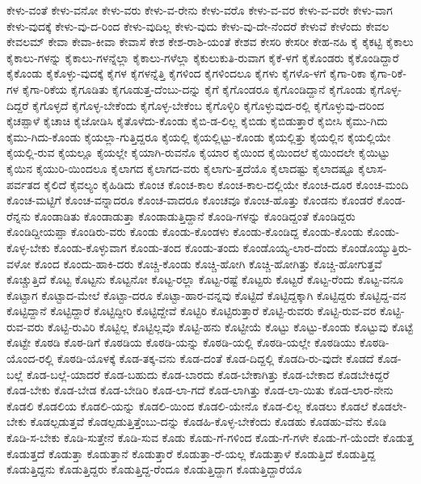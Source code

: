 {ಕೇಳು-ವಂತೆ
ಕೇಳು-ವನೋ
ಕೇಳು-ವರು
ಕೇಳು-ವ-ರೇನು
ಕೇಳು-ವರೊ
ಕೇಳು-ವ-ವರ
ಕೇಳು-ವ-ವರೇ
ಕೇಳು-ವಾಗ
ಕೇಳು-ವುದಕ್ಕೆ
ಕೇಳು-ವು-ದ-ರಿಂದ
ಕೇಳು-ವುದಿಲ್ಲ
ಕೇಳು-ವುದು
ಕೇಳು-ವು-ದೇ-ನೆಂದರೆ
ಕೇಳುವೆ
ಕೇಳೆಂದು
ಕೇವಲ
ಕೇವಲಮ್
ಕೇವಾ
ಕೇವಾ-ಕೀವಾ
ಕೇವಾಸೆ
ಕೇಶ
ಕೇಶ-ರಾಶಿ-ಯಂತೆ
ಕೇಶವ
ಕೇಸರಿ
ಕೇಸರೀ
ಕೇಹ-ನಹಿ
ಕೈ
ಕೈಕಟ್ಟಿ
ಕೈಕಾಲು
ಕೈಕಾಲು-ಗಳನ್ನು
ಕೈಕಾಲು-ಗಳನ್ನೆಲ್ಲಾ
ಕೈಕಾಲು-ಗಳೆಲ್ಲಾ
ಕೈಕುಲುಕುತಿ-ರುವಾಗ
ಕೈಕೆ-ಳಗೆ
ಕೈಕೊಂಡರು
ಕೈಕೊಂಡಿದ್ದಾರೆ
ಕೈಕೊಂಡು
ಕೈಕೊಳ್ಳು-ವುದಕ್ಕೆ
ಕೈಗಳ
ಕೈಗಳನ್ನೆತ್ತಿ
ಕೈಗಳಿಂದ
ಕೈಗಳಿಂದಲೂ
ಕೈಗಳು
ಕೈಗಳೊ-ಳಗೆ
ಕೈಗಾ-ರಿಕಾ
ಕೈಗಾ-ರಿಕೆ-ಗಳ
ಕೈಗಾ-ರಿಕೆಯ
ಕೈಗೂಡಿತು
ಕೈಗೂಡುತ್ತ-ದೆಂಬು-ದನ್ನು
ಕೈಗೆ
ಕೈಗೊಂಡರೂ
ಕೈಗೊಂಡಿದ್ದಾನೆ
ಕೈಗೊಂಡು
ಕೈಗೊಳ್ಳ-ದಿದ್ದರೆ
ಕೈಗೊಳ್ಳದೆ
ಕೈಗೊಳ್ಳ-ಬೇಕೆಂದು
ಕೈಗೊಳ್ಳ-ಬೇಕೆಂಬ
ಕೈಗೊಳ್ಳಿರಿ
ಕೈಗೊಳ್ಳುವುದ-ರಲ್ಲಿ
ಕೈಗೊಳ್ಳುವು-ದರಿಂದ
ಕೈಚಪ್ಪಾಳೆ
ಕೈಚಾಚಿ
ಕೈಜೋಡಿಸಿ
ಕೈತೊಳೆದು-ಕೊಂಡು
ಕೈಬಿ-ಡ-ಲಿಲ್ಲ
ಕೈಬಿಡು
ಕೈಬಿಡುತ್ತಾರೆ
ಕೈಬೀಸಿ
ಕೈಮು-ಗಿದು
ಕೈಮು-ಗಿದು-ಕೊಂಡು
ಕೈಯಲ್ಲಾ-ಗುತ್ತಿದ್ದರೂ
ಕೈಯಲ್ಲಿ
ಕೈಯಲ್ಲಿಟ್ಟು-ಕೊಂಡು
ಕೈಯಲ್ಲಿತ್ತು
ಕೈಯಲ್ಲಿನ
ಕೈಯಲ್ಲಿಯೇ
ಕೈಯಲ್ಲಿ-ರುವ
ಕೈಯಲ್ಲೂ
ಕೈಯಲ್ಲೇ
ಕೈಯಾಗಿ-ರುವನೊ
ಕೈಯಾರ
ಕೈಯಿಂದ
ಕೈಯಿಂದಲೆ
ಕೈಯಿಂದಲೇ
ಕೈಯಿಟ್ಟು
ಕೈಯಿನ
ಕೈಯುರಿ-ಯಿಂದಲೂ
ಕೈಲಾಗದ
ಕೈಲಾಗದ-ವರು
ಕೈಲಾಗು-ತ್ತದೆಯೊ
ಕೈಲಾದಷ್ಟು
ಕೈಲಾದಷ್ಟೂ
ಕೈಲಾಸ-ಪರ್ವತದ
ಕೈಲಿದೆ
ಕೈವಲ್ಯಂ
ಕೈಹಿಡಿದು
ಕೊಂಚ
ಕೊಂಚ-ಕಾಲ
ಕೊಂಚ-ಕಾಲ-ದಲ್ಲಿಯೇ
ಕೊಂಚ-ದೂರ
ಕೊಂಚ-ಮಂದಿ
ಕೊಂಚ-ಮಟ್ಟಿಗೆ
ಕೊಂಚ-ವನ್ನಾದರೂ
ಕೊಂಚ-ವಾದರೂ
ಕೊಂಚವೂ
ಕೊಂಚ-ಹೊತ್ತು
ಕೊಂಡನು
ಕೊಂಡರೆ
ಕೊಂಡ-ರೆನ್ನನು
ಕೊಂಡಾಡಿತು
ಕೊಂಡಾಡುತ್ತಾ
ಕೊಂಡಾಡುತ್ತಿದ್ದಾನೆ
ಕೊಂಡಿ-ಗಳನ್ನು
ಕೊಂಡಿದ್ದಂತೆ
ಕೊಂಡಿದ್ದರು
ಕೊಂಡಿದ್ದೀಯಪ್ಪಾ
ಕೊಂಡಿರು-ವರು
ಕೊಂಡು
ಕೊಂಡು-ಕೊಂಡಳು
ಕೊಂಡು-ಕೊಂಡಿದ್ದ
ಕೊಂಡು-ಕೊಂಡು
ಕೊಂಡು-ಕೊಳ್ಳ-ಬೇಕು
ಕೊಂಡು-ಕೊಳ್ಳುವಾಗ
ಕೊಂಡು-ತಂದ
ಕೊಂಡು-ತಂದು
ಕೊಂಡೊಯ್ಯ-ಲಾರ-ದೆಂದು
ಕೊಂಡೊಯ್ಯುತ್ತಿರು-ವಳೋ
ಕೊಂದ
ಕೊಂದು-ಹಾಕಿ-ದರು
ಕೊಚ್ಚಿ-ಕೊಂಡು
ಕೊಚ್ಚಿ-ಹೋಗಿ
ಕೊಚ್ಚಿ-ಹೋಗಿತ್ತು
ಕೊಚ್ಚಿ-ಹೋಗುತ್ತವೆ
ಕೊಚ್ಚುತ್ತಿದೆ
ಕೊಟ್ಟ
ಕೊಟ್ಟನು
ಕೊಟ್ಟನೋ
ಕೊಟ್ಟ-ರಲ್ಲಾ
ಕೊಟ್ಟ-ರಷ್ಟೆ
ಕೊಟ್ಟರು
ಕೊಟ್ಟರೆ
ಕೊಟ್ಟ-ರೆಂದು
ಕೊಟ್ಟ-ವನೂ
ಕೊಟ್ಟಾಗ
ಕೊಟ್ಟಾದ-ಮೇಲೆ
ಕೊಟ್ಟಾ-ದರೂ
ಕೊಟ್ಟಾ-ಹಾರ-ವನ್ನವು
ಕೊಟ್ಟಿದೆ
ಕೊಟ್ಟಿದ್ದಕ್ಕಾಗಿ
ಕೊಟ್ಟಿದ್ದರು
ಕೊಟ್ಟಿದ್ದ-ವನ
ಕೊಟ್ಟಿದ್ದಾನೆ
ಕೊಟ್ಟಿದ್ದಾರೆ
ಕೊಟ್ಟಿದ್ದೀರಿ
ಕೊಟ್ಟಿದ್ದೇವೆ
ಕೊಟ್ಟಿರಿ
ಕೊಟ್ಟಿರುತ್ತಾರೆ
ಕೊಟ್ಟಿ-ರುವರು
ಕೊಟ್ಟಿ-ರುವ-ವರ
ಕೊಟ್ಟಿ-ರುವ-ವರು
ಕೊಟ್ಟಿ-ರುವಿರಿ
ಕೊಟ್ಟಿಲ್ಲ
ಕೊಟ್ಟಿಲ್ಲವೊ
ಕೊಟ್ಟಿ-ಹನು
ಕೊಟ್ಟೀಯೆ
ಕೊಟ್ಟು
ಕೊಟ್ಟು-ಕೊಂಡು
ಕೊಟ್ಟುವು
ಕೊಟ್ಟೆ
ಕೊಟ್ಟೇ
ಕೊಠಡಿ
ಕೊಠ-ಡಿಗೆ
ಕೊಠಡಿಯ
ಕೊಠಡಿ-ಯನ್ನು
ಕೊಠಡಿ-ಯಲ್ಲಿ
ಕೊಠಡಿ-ಯಲ್ಲೇ
ಕೊಠಡಿಯು
ಕೊಠಡಿ-ಯೊಂದ-ರಲ್ಲಿ
ಕೊಠಡಿ-ಯೊಳಕ್ಕೆ
ಕೊಡ-ತಕ್ಕ-ವನು
ಕೊಡ-ದಂತೆ
ಕೊಡ-ದಿದ್ದಲ್ಲಿ
ಕೊಡದಿ-ರು-ವುದೇ
ಕೊಡದೆ
ಕೊಡ-ಬಲ್ಲೆ
ಕೊಡ-ಬಲ್ಲೆ-ಯಾದರೆ
ಕೊಡ-ಬಹುದು
ಕೊಡ-ಬಾರದು
ಕೊಡ-ಬೇಕಾಗಿತ್ತು
ಕೊಡ-ಬೇಕಾದ
ಕೊಡಬೇಕಿದ್ದರೆ
ಕೊಡ-ಬೇಕು
ಕೊಡ-ಬೇಡ
ಕೊಡ-ಬೇಡಿರಿ
ಕೊಡ-ಲಾ-ಗದೆ
ಕೊಡ-ಲಾಗಿತ್ತು
ಕೊಡ-ಲಾ-ಯಿತು
ಕೊಡ-ಲಾರ-ನೇನು
ಕೊಡಲಿ
ಕೊಡಲಿಯ
ಕೊಡಲಿ-ಯನ್ನು
ಕೊಡಲಿ-ಯಿಂದ
ಕೊಡಲಿ-ಯೇನೊ
ಕೊಡ-ಲಿಲ್ಲ
ಕೊಡಲು
ಕೊಡಲೆ
ಕೊಡಲೇ-ಬೇಕು
ಕೊಡಲ್ಪಡುತ್ತವೆ
ಕೊಡಲ್ಪಡುತ್ತಿತ್ತೆಂಬು-ದನ್ನು
ಕೊಡಹಿ-ಕೊಳ್ಳ-ಬೇಕೆಂದು
ಕೊಡಹು
ಕೊಡಹು-ವೆನು
ಕೊಡಿ
ಕೊಡಿ-ಸ-ಬೇಕು
ಕೊಡಿ-ಸುತ್ತೇನೆ
ಕೊಡಿ-ಸುವ
ಕೊಡು
ಕೊಡು-ಗೆ-ಗಳಿಂದ
ಕೊಡು-ಗೆ-ಗಳೇ
ಕೊಡು-ಗೆ-ಯೆಂದೇ
ಕೊಡುತ್ತ
ಕೊಡುತ್ತದೆ
ಕೊಡುತ್ತಾ
ಕೊಡುತ್ತಾನೆ
ಕೊಡುತ್ತಾರೆ
ಕೊಡುತ್ತಾ-ರೆ-ಯಲ್ಲ
ಕೊಡುತ್ತಾಳೆ
ಕೊಡುತ್ತಿದೆ
ಕೊಡುತ್ತಿದ್ದ
ಕೊಡುತ್ತಿದ್ದನು
ಕೊಡುತ್ತಿದ್ದರು
ಕೊಡುತ್ತಿದ್ದ-ರೆಂದೂ
ಕೊಡುತ್ತಿದ್ದಾಗ
ಕೊಡುತ್ತಿದ್ದಾರೆಯೊ
}
